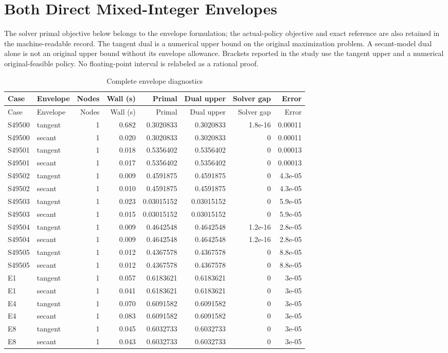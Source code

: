 \section{Both Direct Mixed-Integer Envelopes}
The solver primal objective below belongs to the envelope formulation; the actual-policy objective and exact reference are also retained in the machine-readable record. The tangent dual is a numerical upper bound on the original maximization problem. A secant-model dual alone is not an original upper bound without its envelope allowance. Brackets reported in the study use the tangent upper and a numerical original-feasible policy. No floating-point interval is relabeled as a rational proof.
\begingroup\small\setlength{\tabcolsep}{3pt}
\begin{longtable}{llrrrrrr}
\caption{Complete envelope diagnostics}\\\toprule
Case & Envelope & Nodes & Wall (s) & Primal & Dual upper & Solver gap & Error\\\midrule\endfirsthead
\toprule Case & Envelope & Nodes & Wall (s) & Primal & Dual upper & Solver gap & Error\\\midrule\endhead
\bottomrule\endfoot
S49500 & tangent & 1 & 0.682 & 0.3020833 & 0.3020833 & 1.8e-16 & 0.00011 \\
S49500 & secant & 1 & 0.020 & 0.3020833 & 0.3020833 & 0 & 0.00011 \\
S49501 & tangent & 1 & 0.018 & 0.5356402 & 0.5356402 & 0 & 0.00013 \\
S49501 & secant & 1 & 0.017 & 0.5356402 & 0.5356402 & 0 & 0.00013 \\
S49502 & tangent & 1 & 0.009 & 0.4591875 & 0.4591875 & 0 & 4.3e-05 \\
S49502 & secant & 1 & 0.010 & 0.4591875 & 0.4591875 & 0 & 4.3e-05 \\
S49503 & tangent & 1 & 0.023 & 0.03015152 & 0.03015152 & 0 & 5.9e-05 \\
S49503 & secant & 1 & 0.015 & 0.03015152 & 0.03015152 & 0 & 5.9e-05 \\
S49504 & tangent & 1 & 0.009 & 0.4642548 & 0.4642548 & 1.2e-16 & 2.8e-05 \\
S49504 & secant & 1 & 0.009 & 0.4642548 & 0.4642548 & 1.2e-16 & 2.8e-05 \\
S49505 & tangent & 1 & 0.012 & 0.4367578 & 0.4367578 & 0 & 8.8e-05 \\
S49505 & secant & 1 & 0.012 & 0.4367578 & 0.4367578 & 0 & 8.8e-05 \\
E1 & tangent & 1 & 0.057 & 0.6183621 & 0.6183621 & 0 & 3e-05 \\
E1 & secant & 1 & 0.041 & 0.6183621 & 0.6183621 & 0 & 3e-05 \\
E4 & tangent & 1 & 0.070 & 0.6091582 & 0.6091582 & 0 & 3e-05 \\
E4 & secant & 1 & 0.083 & 0.6091582 & 0.6091582 & 0 & 3e-05 \\
E8 & tangent & 1 & 0.045 & 0.6032733 & 0.6032733 & 0 & 3e-05 \\
E8 & secant & 1 & 0.043 & 0.6032733 & 0.6032733 & 0 & 3e-05 \\
\end{longtable}\endgroup
